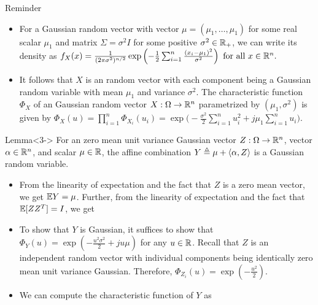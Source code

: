 \documentclass[12pt,aspectratio=169]{beamer}
\begin{document}
\begin{frame}
\begin{block}{Reminder} 
\begin{itemize}
\item <1-> For a Gaussian random vector with vector $\mu = (\mu_1, \dots, \mu_1)$ for some real scalar $\mu_1$ and matrix $\Sigma = \sigma^2I$ for some positive $\sigma^2 \in \mathbb{R}_+$, 
we can write its density as 
$
f_X(x) = \frac{1}{(2\pi\sigma^2)^{n/2}}\exp\left(-\frac{1}{2}\sum_{i=1}^n\frac{(x_i-\mu_1)^2}{\sigma^2}\right)\text{ for all }x \in \mathbb{R}^n.
$
\item <2->It follows that $X$ is an \iid random vector with each component being a Gaussian random variable with mean $\mu_1$ and variance $\sigma^2$. 
The characteristic function $\Phi_X$ of an \iid Gaussian random vector $X:\Omega\to \mathbb{R}^n$ parametrized by $(\mu_1,\sigma^2)$ is given by 
$
\Phi_X(u) = \prod_{i=1}^n\Phi_{X_i}(u_i) = \exp\Big(-\frac{\sigma^2}{2}\sum_{i=1}^nu_i^2 +j\mu_1\sum_{i=1}^nu_i\Big).
$
\end{itemize}
\end{block}
\begin{block}{Lemma}<3->
For an \iid zero mean unit variance Gaussian vector $Z:\Omega\to\mathbb{R}^n$, vector $\alpha \in \mathbb{R}^n$, and scalar $\mu \in \mathbb{R}$, 
the affine combination $Y \triangleq \mu + \left\langle \alpha, Z\right\rangle$ is a Gaussian random variable.  
\end{block}
\end{frame}



\begin{frame}
\begin{Proof}
\begin{itemize}
\item <1->From the linearity of expectation and the fact that $Z$ is a zero mean vector, 
we get $\mathbb{E} Y = \mu$. 
Further, from the linearity of expectation and the fact that $\mathbb{E}[ZZ^T] = I$, we get 
\item <2->To show that $Y$ is Gaussian, 
it suffices to show that $\Phi_Y(u) = \exp(-\frac{u^2\sigma^2}{2}+ju\mu)$ for any $u \in \mathbb{R}$. 
Recall that $Z$ is an independent random vector with individual components being identically zero mean unit variance Gaussian. Therefore, $\Phi_{Z_i}(u) = \exp(-\frac{u^2}{2})$.
\item <3-> We can compute the characteristic function of $Y$ as 
\end{itemize}
\end{Proof}
\end{frame}
\end{document}
